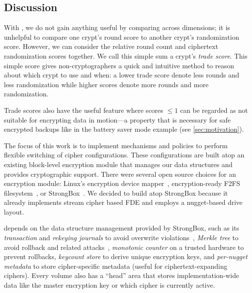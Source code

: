 \subsection{Discussion}\label{subsec:des-discussion}



 With \sysC, we do not gain anything useful by comparing
across dimensions; \ie it is unhelpful to compare one crypt's round score to
another crypt's randomization score. However, we can consider the relative round
count and ciphertext randomization scores together. We call this simple sum a
crypt's {\em trade score}. This simple score gives non-cryptographers a quick
and intuitive method to reason about which crypt to use and when: a lower trade
score denote less rounds and less randomization while higher scores denote more
rounds and more randomization.

Trade scores also have the useful feature where scores $\leq1$ can be regarded
as not suitable for encrypting data in motion---a property that is necessary for
safe encrypted backups like in the battery saver mode example (see
\cref{sec:motivation}).


 The focus of this work is to implement
mechanisms and policies to perform flexible switching of cipher configurations.
These configurations are built atop an existing block-level encryption module
that manages our data structures and provides cryptographic support. There were
several open source choices for an encryption module: Linux's encryption device
mapper~\cite{dmcrypt,DmC-Android}, encryption-ready F2FS filesystem~\cite{F2FS},
or StrongBox~\cite{StrongBox}. We decided to build \sys atop StrongBox because
it already implements stream cipher based FDE and employs a nugget-based drive
layout.

\sys depends on the data structure management provided by StrongBox, such as its
{\em transaction} and {\em rekeying journals} to avoid overwrite
violations~\cite{StrongBox}, {\em Merkle tree} to avoid rollback and related
attacks~\cite{StrongBox}, {\em monotonic counter} on a trusted hardware to
prevent rollbacks, {\em keycount store} to derive unique encryption keys, and
{\em per-nugget metadata} to store cipher-specific metadata (useful for
ciphertext-expanding ciphers). Every \sys volume also has a ``head'' area that
stores implementation-wide data like the master encryption key or which cipher
is currently active.

